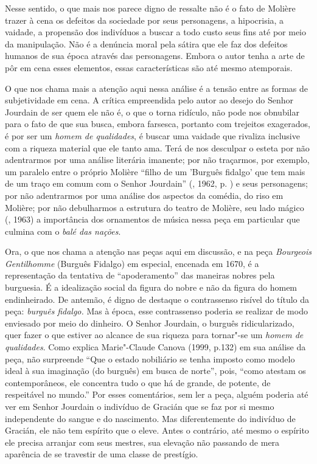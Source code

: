 Nesse sentido, o que mais nos parece digno de ressalte não é o fato de
Molière trazer à cena os defeitos da sociedade por seus personagens, a
hipocrisia, a vaidade, a propensão dos indivíduos a buscar a todo custo
seus fins até por meio da manipulação. Não é a denúncia moral pela
sátira que ele faz dos defeitos humanos de sua época através das
personagens. Embora o autor tenha a arte de pôr em cena esses elementos,
essas características são até mesmo atemporais.

O que nos chama mais a atenção aqui nessa análise é a tensão entre as
formas de subjetividade em cena. A crítica empreendida pelo autor ao
desejo do Senhor Jourdain de ser quem ele não é, o que o torna ridículo,
não pode nos obnubilar para o fato de que sua busca, embora farsesca,
portanto com trejeitos exagerados, é por ser um \emph{homem de
qualidades}, é buscar uma vaidade que rivaliza inclusive com a riqueza
material que ele tanto ama. Terá de nos desculpar o esteta por não
adentrarmos por uma análise literária imanente; por não traçarmos, por
exemplo, um paralelo entre o próprio Molière ``filho de um 'Burguês
fidalgo' que tem mais de um traço em comum com o Senhor Jourdain'' (,
1962, p. ) e seus personagens; por não adentrarmos por uma análise dos
aspectos da comédia, do riso em Molière; por não debulharmos a estrutura
do teatro de Molière, seu lado mágico (, 1963) a importância
dos ornamentos de música nessa peça em particular que culmina com o
\emph{balé das nações}.

Ora, o que nos chama a atenção nas peças aqui em discussão, e na peça
\emph{Bourgeois} \emph{Gentilhomme} (Burguês Fidalgo) em especial,
encenada em 1670, é a representação da tentativa de ``apoderamento'' das
maneiras nobres pela burguesia. É a idealização social da figura do
nobre e não da figura do homem endinheirado. De antemão, é digno de
destaque o contrassenso risível do título da peça: \emph{burguês}
\emph{fidalgo.} Mas à época, esse contrassenso poderia se realizar de
modo enviesado por meio do dinheiro. O Senhor Jourdain, o burguês
ridicularizado, quer fazer o que estiver ao alcance de sua riqueza para
tornar"-se um \emph{homem de qualidades}. Como explica Marie"-Claude
Canova (1999, p.132) em sua análise da peça, não surpreende ``Que o
estado nobiliário se tenha imposto como modelo ideal à sua imaginação
(do burguês) em busca de norte'', pois, ``como atestam os
contemporâneos, ele concentra tudo o que há de grande, de potente, de
respeitável no mundo.'' Por esses comentários, sem ler a peça, alguém
poderia até ver em Senhor Jourdain o indivíduo de Gracián que se faz por
si mesmo independente do sangue e do nascimento. Mas diferentemente do
indivíduo de Gracián, ele não tem espírito que o eleve. Antes o
contrário, até mesmo o espírito ele precisa arranjar com seus mestres,
sua elevação não passando de mera aparência de se travestir de uma
classe de prestígio.

